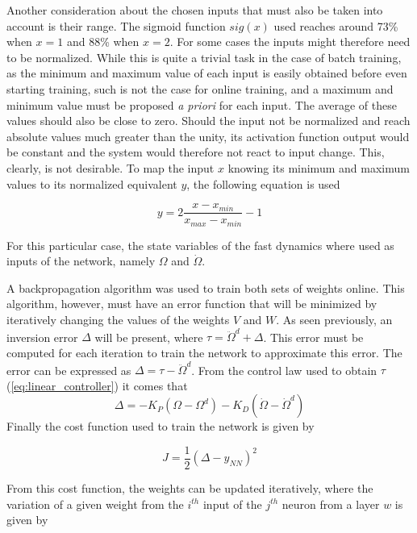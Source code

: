 Another consideration about the chosen inputs that must also be taken into account is their range. The sigmoid function $sig(x)$ used reaches around 73\% when $x=1$ and 88\% when $x=2$. For some cases the inputs might therefore need to be normalized. While this is quite a trivial task in the case of batch training, as the minimum and maximum value of each input is easily obtained before even starting training, such is not the case for online training, and a maximum and minimum value must be proposed \emph{a priori} for each input. The average of these values should also be close to zero. Should the input not be normalized and reach absolute values much greater than the unity, its activation function output would be constant and the system would therefore not react to input change. This, clearly, is not desirable. To map the input $x$ knowing its minimum and maximum values to its normalized equivalent $y$, the following equation is used

\begin{equation}
y=2\dfrac{x-x_{min}}{x_{max}-x_{min}}-1
\label{eq:normalisation}
\end{equation}

For this  particular case, the state variables of the fast dynamics where used as inputs of the network, namely $\Omega$ and $\dot{\Omega}$.

A backpropagation algorithm was used to train both sets of weights online. This algorithm, however, must have an error function that will be minimized by iteratively changing the values of the weights $V$ and $W$. As seen previously, an inversion error $\Delta$ will be present, where $\tau = \ddot{\Omega}^d + \Delta$. This error must be computed for each iteration to train the network to approximate this error. The error can be expressed as $\Delta=\tau - \ddot{\Omega}^d$.
From the control law used to obtain $\tau$ (\ref{eq:linear_controller}) it comes that
\begin{equation}
\Delta = -K_P(\Omega-\Omega^d)-K_D(\dot{\Omega}-\dot{\Omega}^d)
\label{eq:inversion_error}
\end{equation}
Finally the cost function used to train the network is given by

\begin{equation}
J=\dfrac{1}{2}(\Delta-y_{NN})^2
\label{eq:NN_cost}
\end{equation}

From this cost function, the weights can be updated iteratively, where the variation of a given weight from the $i^{th}$ input of the $j^{th}$ neuron from a layer $w$ is given by

